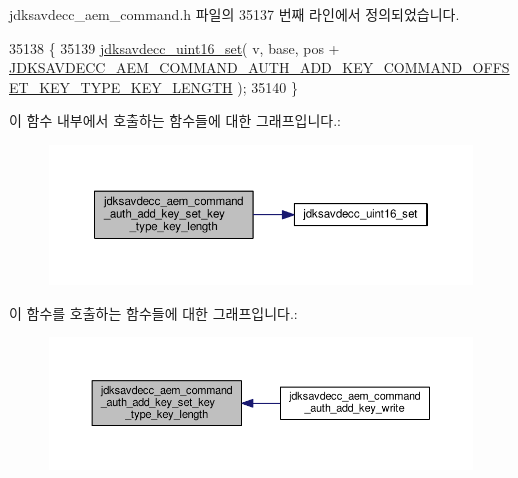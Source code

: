 jdksavdecc\+\_\+aem\+\_\+command.\+h 파일의 35137 번째 라인에서 정의되었습니다.


\begin{DoxyCode}
35138 \{
35139     \hyperlink{group__endian_ga14b9eeadc05f94334096c127c955a60b}{jdksavdecc\_uint16\_set}( v, base, pos + 
      \hyperlink{group__command__auth__add__key_ga1478144e2dbf8fa0a47cf46d915bdb4b}{JDKSAVDECC\_AEM\_COMMAND\_AUTH\_ADD\_KEY\_COMMAND\_OFFSET\_KEY\_TYPE\_KEY\_LENGTH}
       );
35140 \}
\end{DoxyCode}


이 함수 내부에서 호출하는 함수들에 대한 그래프입니다.\+:
\nopagebreak
\begin{figure}[H]
\begin{center}
\leavevmode
\includegraphics[width=350pt]{group__command__auth__add__key_ga44e4a2fc450897df2561add7971b7228_cgraph}
\end{center}
\end{figure}




이 함수를 호출하는 함수들에 대한 그래프입니다.\+:
\nopagebreak
\begin{figure}[H]
\begin{center}
\leavevmode
\includegraphics[width=350pt]{group__command__auth__add__key_ga44e4a2fc450897df2561add7971b7228_icgraph}
\end{center}
\end{figure}


